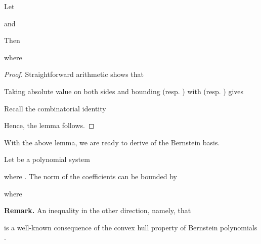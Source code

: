 \documentclass[12pt]{article}
\begin{document}
\begin{lemma}
\label{productbez} Let

and

Then

where

\begin{proof}
Straightforward arithmetic shows that

Taking absolute value on both sides and bounding  (resp.
) with  (resp. ) gives

Recall the combinatorial identity

Hence, the lemma follows.
\end{proof}
\end{lemma}

With the above lemma, we are ready to derive  of the Bernstein basis.

\begin{thm}
\label{bibound} Let  be a polynomial system

where . The norm of the coefficients
can be bounded by

where

\end{thm}

\begin{flushleft}
\textbf{Remark.} An inequality in the other
direction, namely, that

is a well-known consequence of the convex hull property of
Bernstein polynomials \cite{farin}.
\end{flushleft}
\end{document}
